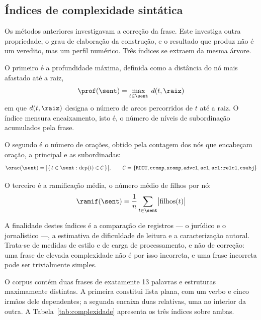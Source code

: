 \subsection{Índices de complexidade sintática}
\label{met:complexidade}

Os métodos anteriores investigavam a correção da frase. Este investiga outra propriedade, o
grau de elaboração da construção, e o resultado que produz não é um veredito, mas um perfil
numérico. Três índices se extraem da mesma árvore.

O primeiro é a profundidade máxima, definida como a distância do nó mais afastado até a raiz,
%
\begin{equation}
\prof(\sent) = \max_{t \in \sent} \; d(t, \raiz)
\end{equation}
%
em que $d(t,\raiz)$ designa o número de arcos percorridos de $t$ até a raiz. O índice mensura
encaixamento, isto é, o número de níveis de subordinação acumulados pela frase.

O segundo é o número de orações, obtido pela contagem dos nós que encabeçam oração, a
principal e as subordinadas:
%
\begin{equation}
\orac(\sent) = \bigl|\{\, t \in \sent : \mathrm{dep}(t) \in \mathcal{C} \,\}\bigr|,
\qquad \mathcal{C} = \{\texttt{ROOT}, \texttt{ccomp}, \texttt{xcomp}, \texttt{advcl},
\texttt{acl}, \texttt{acl:relcl}, \texttt{csubj}\}
\end{equation}

O terceiro é a ramificação média, o número médio de filhos por nó:
%
\begin{equation}
\ramif(\sent) = \frac{1}{n}\sum_{t \in \sent} \bigl|\mathrm{filhos}(t)\bigr|
\end{equation}

A finalidade destes índices é a comparação de registros --- o jurídico e o jornalístico ---,
a estimativa de dificuldade de leitura e a caracterização autoral. Trata-se de medidas de
estilo e de carga de processamento, e não de correção: uma frase de elevada complexidade não
é por isso incorreta, e uma frase incorreta pode ser trivialmente simples.

O corpus contém duas frases de exatamente 13 palavras e estruturas maximamente distintas. A
primeira constitui lista plana, com um verbo e cinco irmãos dele dependentes; a segunda
encaixa duas relativas, uma no interior da outra. A Tabela~\ref{tab:complexidade} apresenta
os três índices sobre ambas.

